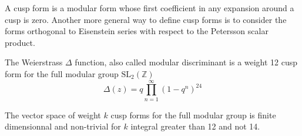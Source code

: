 \documentclass[12pt]{article}
\newcommand{\sldeuxz}{\textrm{SL}_{2}(\mathbb Z)}
\begin{document}
A cusp form is a modular form whose first coefficient in any expansion around a cusp is zero. Another more general way to define cusp forms is to consider the forms orthogonal to Eisenstein series with respect to the Petersson scalar product.

The Weierstrass $\Delta$ function, also called modular discriminant is a weight 12 cusp form for the full modular group $\sldeuxz$
\begin{equation}
\Delta(z)=q\underset{n=1}{\overset{\infty}{\prod}}(1-q^n)^{24}
\end{equation}

The vector space of weight $k$ cusp forms for the full modular group is finite dimensionnal and non-trivial for $k$ integral greater than 12 and not 14.
\end{document}
